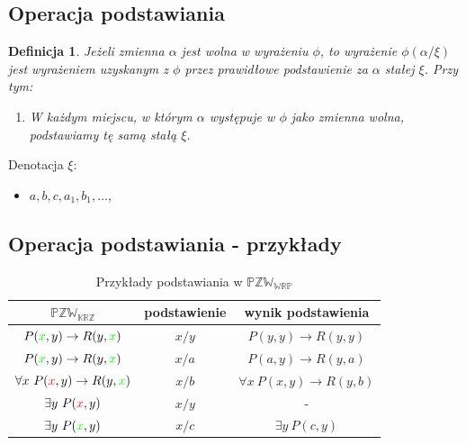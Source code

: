 \documentclass[12pt]{article}
\newtheorem{definicja}{Definicja}
\newcommand {\PZWKRZ} {\ensuremath{\mathbb{PZW_{KRZ}}}}
\newcommand {\PZWWRP} {\ensuremath{\mathbb{PZW_{WRP}}}}
\begin{document}
\subsection{Operacja podstawiania}
%
\begin{definicja}
Jeżeli zmienna $\alpha$ jest wolna w wyrażeniu $\phi$, to wyrażenie $\phi(\alpha / \xi)$ jest wyrażeniem uzyskanym z $\phi$ przez prawidłowe podstawienie za $\alpha$ stałej $\xi$. Przy tym:
\begin{enumerate}
\item W każdym miejscu, w którym $\alpha$ występuje w $\phi$ jako zmienna wolna, podstawiamy tę samą stałą $\xi$.
\end{enumerate}
\end{definicja}
%
Denotacja $\xi$:
\begin{itemize}
\item $a, b, c, a_{1}, b_{1}, \dots$,
\end{itemize}
%


\subsection{Operacja podstawiania - przykłady}
\begin{table}[p]
\caption{Przykłady podstawiania w \PZWWRP}
\begin{center}
\begin{tabular}{|c|c|c|}
\hline
\textbf{\PZWKRZ} & \textbf{podstawienie} & \textbf{wynik podstawienia}\\
\hline
$P(\textcolor[rgb]{0.00,1.00,0.00}{x},y) \to R(y, \textcolor[rgb]{0.00,1.00,0.00}{x})$& $x/y$ & $P(y,y) \to R(y,y)$\\
\hline
$P(\textcolor[rgb]{0.00,1.00,0.00}{x},y) \to R(y, \textcolor[rgb]{0.00,1.00,0.00}{x})$& $x/a$ & $P(a,y) \to R(y,a)$\\
\hline
$\forall x~ P(\textcolor[rgb]{0.98,0.00,0.00}{x},y) \to R(y,\textcolor[rgb]{0.00,1.00,0.00}{x})$ & $x/b$ & $\forall x~ P(x,y) \to R(y,b)$\\
\hline
$\exists y~ P(\textcolor[rgb]{0.98,0.00,0.00}{x},y)$ & $x/y$ & - \\
\hline
$\exists y~ P(\textcolor[rgb]{0.00,1.00,0.00}{x},y)$ & $x/c$ & $\exists y~ P(c,y)$ \\
\hline
\end{tabular}
\end{center}
\label{Podstawianie}
\end{table}
%
\end{document}

